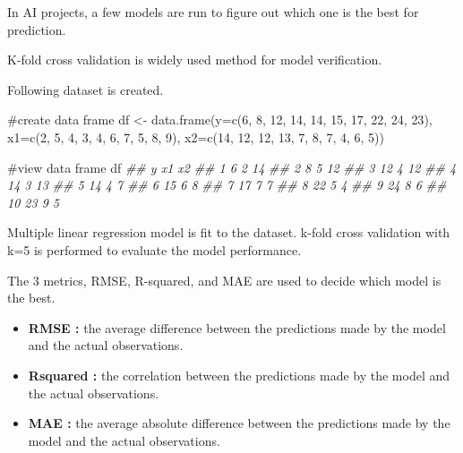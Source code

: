 \documentclass[
  letterpaper,
  DIV=11,
  numbers=noendperiod]{scrreprt}
\newenvironment{Shaded}{\begin{snugshade}}{\end{snugshade}}
\newcommand{\AttributeTok}[1]{\textcolor[rgb]{0.40,0.45,0.13}{#1}}
\newcommand{\CommentTok}[1]{\textcolor[rgb]{0.37,0.37,0.37}{#1}}
\newcommand{\DecValTok}[1]{\textcolor[rgb]{0.68,0.00,0.00}{#1}}
\newcommand{\DocumentationTok}[1]{\textcolor[rgb]{0.37,0.37,0.37}{\textit{#1}}}
\newcommand{\FunctionTok}[1]{\textcolor[rgb]{0.28,0.35,0.67}{#1}}
\newcommand{\NormalTok}[1]{\textcolor[rgb]{0.00,0.23,0.31}{#1}}
\newcommand{\OtherTok}[1]{\textcolor[rgb]{0.00,0.23,0.31}{#1}}
\begin{document}
In AI projects, a few models are run to figure out which one is the best
for prediction.

K-fold cross validation is widely used method for model verification.

Following dataset is created.

\begin{Shaded}
\begin{Highlighting}[]
\CommentTok{\#create data frame}
\NormalTok{df }\OtherTok{\textless{}{-}} \FunctionTok{data.frame}\NormalTok{(}\AttributeTok{y=}\FunctionTok{c}\NormalTok{(}\DecValTok{6}\NormalTok{, }\DecValTok{8}\NormalTok{, }\DecValTok{12}\NormalTok{, }\DecValTok{14}\NormalTok{, }\DecValTok{14}\NormalTok{, }\DecValTok{15}\NormalTok{, }\DecValTok{17}\NormalTok{, }\DecValTok{22}\NormalTok{, }\DecValTok{24}\NormalTok{, }\DecValTok{23}\NormalTok{),}
                 \AttributeTok{x1=}\FunctionTok{c}\NormalTok{(}\DecValTok{2}\NormalTok{, }\DecValTok{5}\NormalTok{, }\DecValTok{4}\NormalTok{, }\DecValTok{3}\NormalTok{, }\DecValTok{4}\NormalTok{, }\DecValTok{6}\NormalTok{, }\DecValTok{7}\NormalTok{, }\DecValTok{5}\NormalTok{, }\DecValTok{8}\NormalTok{, }\DecValTok{9}\NormalTok{),}
                 \AttributeTok{x2=}\FunctionTok{c}\NormalTok{(}\DecValTok{14}\NormalTok{, }\DecValTok{12}\NormalTok{, }\DecValTok{12}\NormalTok{, }\DecValTok{13}\NormalTok{, }\DecValTok{7}\NormalTok{, }\DecValTok{8}\NormalTok{, }\DecValTok{7}\NormalTok{, }\DecValTok{4}\NormalTok{, }\DecValTok{6}\NormalTok{, }\DecValTok{5}\NormalTok{))}

\CommentTok{\#view data frame}
\NormalTok{df}
\DocumentationTok{\#\#     y x1 x2}
\DocumentationTok{\#\# 1   6  2 14}
\DocumentationTok{\#\# 2   8  5 12}
\DocumentationTok{\#\# 3  12  4 12}
\DocumentationTok{\#\# 4  14  3 13}
\DocumentationTok{\#\# 5  14  4  7}
\DocumentationTok{\#\# 6  15  6  8}
\DocumentationTok{\#\# 7  17  7  7}
\DocumentationTok{\#\# 8  22  5  4}
\DocumentationTok{\#\# 9  24  8  6}
\DocumentationTok{\#\# 10 23  9  5}
\end{Highlighting}
\end{Shaded}

Multiple linear regression model is fit to the dataset. k-fold cross
validation with k=5 is performed to evaluate the model performance.

The 3 metrics, RMSE, R-squared, and MAE are used to decide which model
is the best.

\begin{itemize}
\item
  \textbf{RMSE :} the average difference between the predictions made by
  the model and the actual observations.
\item
  \textbf{Rsquared :} the correlation between the predictions made by
  the model and the actual observations.
\item
  \textbf{MAE :} the average absolute difference between the predictions
  made by the model and the actual observations.
\end{itemize}
\end{document}
